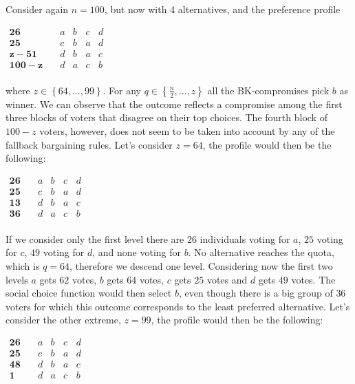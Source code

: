 \documentclass[version=3.21, pagesize, notitlepage, twoside=off, bibliography=totoc, DIV=calc, fontsize=12pt, a4paper]{scrartcl}
\begin{document}
\begin{example}
	\label{ex:exk}
	Consider again $n=100$, but now with 4 alternatives, and the preference profile
	\begin{center}
		$
		\begin{array}{ccccc}
		\mathbf{26} \quad &a&b&c&d\\
		\mathbf{25} \quad &c&b&a&d\\
		\mathbf{z-51} \quad &d&b&a&c\\
		\mathbf{100-z} \quad &d&a&c&b\\
		\end{array}
		$
	\end{center}
where $z\in \left\{ 64,..., 99\right\}$. For any $q\in \left\{ \frac{n}{2},..., z\right\}$ all the BK-compromises pick $b$ as winner. We can observe that the outcome reflects a compromise among the first three blocks of voters that disagree on their top choices. The fourth block of $100-z$ voters, however, does not seem to be taken into account by any of the fallback bargaining rules. 
Let's consider $z=64$, the profile would then be the following: 

\begin{center}
	$
	\begin{array}{ccccc}
	\mathbf{26} \quad &a&b&c&d\\
	\mathbf{25} \quad &c&b&a&d\\
	\mathbf{13} \quad &d&b&a&c\\
	\mathbf{36} \quad &d&a&c&b\\
	\end{array}
	$
\end{center}

If we consider only the first level there are $26$ individuals voting for $a$, $25$ voting for $c$, $49$ voting for $d$, and none voting for $b$. No alternative reaches the quota, which is $q=64$, therefore we descend one level. Considering now the first two levels $a$ gets $62$ votes, $b$ gets $64$ votes, $c$ gets $25$ votes and $d$ gets $49$ votes. The social choice function would then select $b$, even though there is a big group of $36$ voters for which this outcome corresponds to the least preferred alternative.
Let's consider the other extreme, $z=99$, the profile would then be the following: 

\begin{center}
	$
	\begin{array}{ccccc}
	\mathbf{26} \quad &a&b&c&d\\
	\mathbf{25} \quad &c&b&a&d\\
	\mathbf{48} \quad &d&b&a&c\\
	\mathbf{1} \quad &d&a&c&b\\
	\end{array}
	$
\end{center} 


\end{example}
\end{document}
